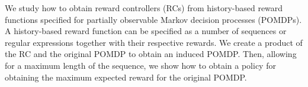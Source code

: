 We study how to obtain reward controllers (RCs) from history-based reward functions specified for partially observable Markov decision processes (POMDPs). A history-based reward function can be specified as a number of sequences or regular expressions together with their respective rewards. We create a product of the RC and the original POMDP to obtain an induced POMDP. Then, allowing for a maximum length of the sequence, we show how to obtain a policy for obtaining the maximum expected reward for the original POMDP.